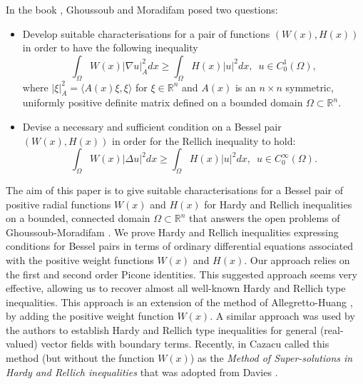 \documentclass[a4paper,12pt,reqno]{amsart}
\theoremstyle{theorem}
\numberwithin{equation}{section}
\theoremstyle{plain}
\theoremstyle{definition}
\theoremstyle{defi}
\begin{document}
In the book \cite{GM_book}, Ghoussoub and Moradifam posed two questions:
\begin{itemize} 
	\item  Develop suitable characterisations for a pair of functions $(W(x),H(x))$ in order to have the following inequality
	\begin{equation*}
	\int_{\Omega} W(x) |\nabla u|_A^2 dx \geq \int_{\Omega} H(x)|u|^2 dx, \,\,\, u \in C^{1}_0(\Omega),
	\end{equation*} 
	where $|\xi|^2_A = \langle A(x)\xi, \xi \rangle$ for $\xi \in \mathbb{R}^n$ and $A(x)$ is an $n\times n$ symmetric, uniformly positive definite matrix defined on a bounded domain $\Omega \subset \mathbb{R}^n$. 
	\item  Devise a necessary and sufficient condition on a Bessel pair $(W(x),H(x))$ in order for the Rellich inequality to hold: 
		\begin{equation*}
	\int_{\Omega} W(x) |\Delta u|^2 dx \geq \int_{\Omega} H(x)|u|^2 dx, \,\,\, u \in C^{\infty}_0(\Omega).
	\end{equation*}
\end{itemize}


The aim of this paper is to give suitable characterisations for a Bessel pair of positive radial functions $W(x)$ and $H(x)$ for Hardy and Rellich inequalities on a bounded, connected domain $\Omega \subset \mathbb{R}^n$ that answers the open problems of Ghoussoub-Moradifam \cite{GM_book}. We prove Hardy and Rellich inequalities expressing conditions for Bessel pairs in terms of ordinary differential equations associated with the positive weight functions $W(x)$ and $H(x)$. Our approach relies on the first and second order Picone identities. This suggested approach seems very effective, allowing us to recover almost all well-known Hardy and Rellich type inequalities. This approach is an extension of the method of Allegretto-Huang \cite[Theorem 2.1]{AH98}, by adding the positive weight function $W(x)$. A similar approach was used by the authors \cite{RSS_NoDEA} to establish Hardy and Rellich type inequalities for general (real-valued) vector fields with boundary terms. Recently, in \cite{Cazacu20} Cazacu called this method (but without the function $W(x)$) as the {\it Method of Super-solutions in Hardy and Rellich inequalities} that was adopted from Davies \cite{Davies99}.
\end{document}
